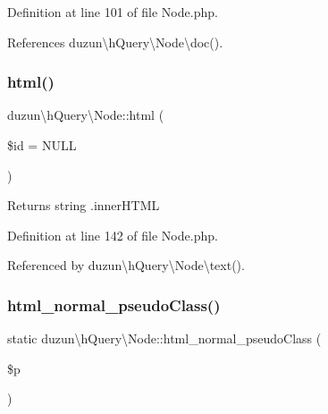 Definition at line 101 of file Node.\+php.



References duzun\textbackslash{}h\+Query\textbackslash{}\+Node\textbackslash{}doc().

\mbox{\label{classduzun_1_1hQuery_1_1Node_a6a251f5f93690fabb794c673388dd49b}} 
\subsubsection{\texorpdfstring{html()}{html()}}
{\footnotesize\ttfamily duzun\textbackslash{}h\+Query\textbackslash{}\+Node\+::html (\begin{DoxyParamCaption}\item[{}]{\$id = {\ttfamily NULL} }\end{DoxyParamCaption})}

\begin{DoxyReturn}{Returns}
string .inner\+H\+T\+ML 
\end{DoxyReturn}


Definition at line 142 of file Node.\+php.



Referenced by duzun\textbackslash{}h\+Query\textbackslash{}\+Node\textbackslash{}text().

\mbox{\label{classduzun_1_1hQuery_1_1Node_a82f0739b0292cfb11570eeca08ac98c4}} 
\subsubsection{\texorpdfstring{html\+\_\+normal\+\_\+pseudo\+Class()}{html\_normal\_pseudoClass()}}
{\footnotesize\ttfamily static duzun\textbackslash{}h\+Query\textbackslash{}\+Node\+::html\+\_\+normal\+\_\+pseudo\+Class (\begin{DoxyParamCaption}\item[{}]{\$p }\end{DoxyParamCaption})\hspace{0.3cm}{\ttfamily [static]}}

